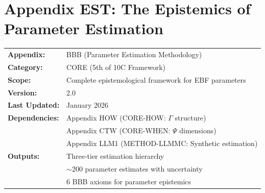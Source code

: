 \section{Appendix EST: The Epistemics of Parameter Estimation}
\label{app:bbb-estimation}


\begin{tcolorbox}[colback=blue!5!white, colframe=blue!75!black,
    title=\textbf{Appendix EST: CORE-WHERE}]

\begin{tabular}{@{}ll@{}}
\textbf{Appendix:} & BBB (Parameter Estimation Methodology) \\
\textbf{Category:} & CORE (5th of 10C Framework) \\
\textbf{Scope:} & Complete epistemological framework for EBF parameters \\
\textbf{Version:} & 2.0 \\
\textbf{Last Updated:} & January 2026 \\
\textbf{Dependencies:} & Appendix HOW (CORE-HOW: $\Gamma$ structure) \\
                       & Appendix CTW (CORE-WHEN: $\Psi$ dimensions) \\
                       & Appendix LLM1 (METHOD-LLMMC: Synthetic estimation) \\
\textbf{Outputs:} & Three-tier estimation hierarchy \\
                  & $\sim$200 parameter estimates with uncertainty \\
                  & 6 BBB axioms for parameter epistemics \\
\end{tabular}

\end{tcolorbox}


